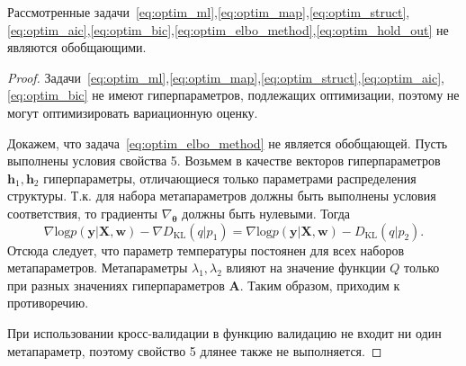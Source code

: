 \begin{theorem}Рассмотренные задачи~\eqref{eq:optim_ml},\eqref{eq:optim_map},\eqref{eq:optim_struct},\eqref{eq:optim_aic},\eqref{eq:optim_bic},\eqref{eq:optim_elbo_method},\eqref{eq:optim_hold_out} не являются обобщающими.
\end{theorem}
\begin{proof}
Задачи~\eqref{eq:optim_ml},\eqref{eq:optim_map},\eqref{eq:optim_struct},\eqref{eq:optim_aic},\eqref{eq:optim_bic} не имеют гиперпараметров, подлежащих оптимизации, поэтому не могут оптимизировать вариационную оценку.

Докажем, что задача~\eqref{eq:optim_elbo_method} не является обобщающей. Пусть выполнены условия свойства 5. Возьмем в качестве векторов гиперпараметров $\mathbf{h}_1,\mathbf{h}_2$ гиперпараметры, отличающиеся только параметрами распределения структуры. Т.к. для набора метапараметров должны быть выполнены условия соответствия, то градиенты $\nabla_{\boldsymbol{\theta}}$ должны быть нулевыми. Тогда
\[\nabla \text{log}p(\mathbf{y}|\mathbf{X}, \mathbf{w}) - \nabla D_\text{KL}(q|p_1) =\nabla\text{log}p(\mathbf{y}|\mathbf{X}, \mathbf{w}) - D_\text{KL}(q|p_2).
\]
Отсюда следует, что параметр температуры постоянен для всех наборов метапараметров.
Метапараметры $\lambda_1, \lambda_2$ влияют на значение функции $Q$ только при разных значениях гиперпараметров $\mathbf{A}$. Таким образом, приходим к противоречию.

При  использовании кросс-валидации в функцию валидацию не входит ни один метапараметр, поэтому свойство 5 длянее также не выполняется. \end{proof}

